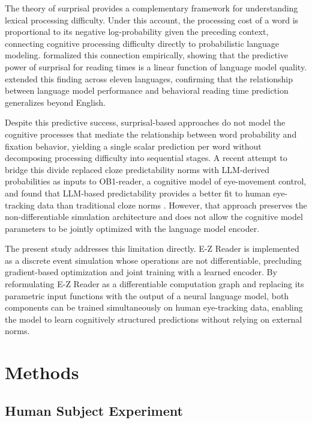 \documentclass[12pt]{article}
\begin{document}
The theory of surprisal \citep{levy2008expectation} provides a complementary
framework for understanding lexical processing difficulty. Under this account,
the processing cost of a word is proportional to its negative log-probability
given the preceding context, connecting cognitive processing difficulty directly
to probabilistic language modeling. \citet{goodkind2018predictive} formalized
this connection empirically, showing that the predictive power of surprisal for
reading times is a linear function of language model quality.
\citet{wilcox2023testing} extended this finding across eleven languages,
confirming that the relationship between language model performance and
behavioral reading time prediction generalizes beyond English.

Despite this predictive success, surprisal-based approaches do not model the
cognitive processes that mediate the relationship between word probability and
fixation behavior, yielding a single scalar prediction per word without
decomposing processing difficulty into sequential stages. A recent attempt to
bridge this divide replaced cloze predictability norms with LLM-derived
probabilities as inputs to OB1-reader, a cognitive model of eye-movement
control, and found that LLM-based predictability provides a better fit to
human eye-tracking data than traditional cloze norms
\citep{lopesrego2024language}. However, that approach preserves the
non-differentiable simulation architecture and does not allow the cognitive
model parameters to be jointly optimized with the language model encoder.

The present study addresses this limitation directly. E-Z Reader is implemented
as a discrete event simulation whose operations are not differentiable,
precluding gradient-based optimization and joint training with a learned
encoder. By reformulating E-Z Reader as a differentiable computation graph and
replacing its parametric input functions with the output of a neural language
model, both components can be trained simultaneously on human eye-tracking
data, enabling the model to learn cognitively structured predictions without
relying on external norms.

\section{Methods}

\subsection{Human Subject Experiment}
\end{document}
